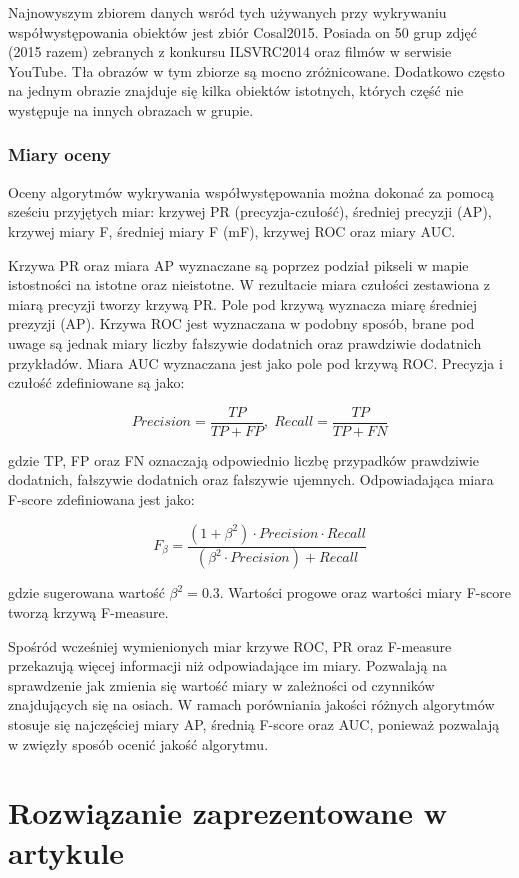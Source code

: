 \documentclass[a4paper,11pt, notitlepage, twosides, openany ]{report}
\begin{document}
	Najnowyszym zbiorem danych wsród tych używanych przy wykrywaniu współwystępowania obiektów jest zbiór Cosal2015. Posiada on 50 grup zdjęć (2015 razem) zebranych z konkursu ILSVRC2014 oraz filmów w serwisie YouTube. Tła obrazów w tym zbiorze są mocno zróżnicowane. Dodatkowo często na jednym obrazie znajduje się kilka obiektów istotnych, których część nie występuje na innych obrazach w grupie.

	\subsection{Miary oceny}
	Oceny algorytmów wykrywania współwystępowania można dokonać za pomocą sześciu przyjętych miar: krzywej PR (precyzja-czułość), średniej precyzji (AP), krzywej miary F, średniej miary F (mF), krzywej ROC oraz miary AUC. 

	Krzywa PR oraz miara AP wyznaczane są poprzez podział pikseli w mapie istostności na istotne oraz nieistotne. W rezultacie miara czułości zestawiona z miarą precyzji tworzy krzywą PR. Pole pod krzywą wyznacza miarę średniej prezyzji (AP). Krzywa ROC jest wyznaczana w podobny sposób, brane pod uwage są jednak miary liczby fałszywie dodatnich oraz prawdziwie dodatnich przykładów. Miara AUC wyznaczana jest jako pole pod krzywą ROC. Precyzja i czułość zdefiniowane są jako:

	$$
		Precision = \frac{TP}{TP + FP}, \; Recall = \frac{TP}{TP + FN}
	$$

	gdzie TP, FP oraz FN oznaczają odpowiednio liczbę przypadków prawdziwie dodatnich, fałszywie dodatnich oraz fałszywie ujemnych. Odpowiadająca miara F-score zdefiniowana jest jako:

	$$
		F_{\beta} = \frac{(1 + \beta^2)\cdot Precision \cdot Recall}{(\beta^2 \cdot Precision) + Recall}
	$$

	gdzie sugerowana wartość $\beta^2 = 0.3$. Wartości progowe oraz wartości miary F-score tworzą krzywą F-measure. 

	Spośród wcześniej wymienionych miar krzywe ROC, PR oraz F-measure przekazują więcej informacji niż odpowiadające im miary. Pozwalają na sprawdzenie jak zmienia się wartość miary w zależności od czynników znajdujących się na osiach. W ramach porówniania jakości różnych algorytmów stosuje się najczęściej miary AP, średnią F-score oraz AUC, ponieważ pozwalają w zwięzły sposób ocenić jakość algorytmu. 

	\chapter{Rozwiązanie zaprezentowane w artykule}
\end{document}
